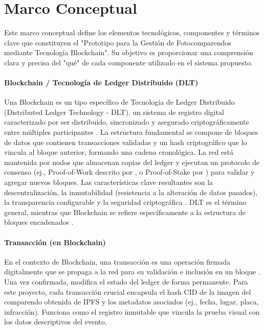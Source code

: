 \section{\large Marco Conceptual}
Este marco conceptual define los elementos tecnológicos, componentes y términos clave que constituyen el "Prototipo para la Gestión de Fotocomparendos mediante Tecnología Blockchain". Su objetivo es proporcionar una comprensión clara y precisa del "qué" de cada componente utilizado en el sistema propuesto. 

\paragraph{Blockchain / Tecnología de Ledger Distribuido (DLT)}
Una Blockchain es un tipo específico de Tecnología de Ledger Distribuido (Distributed Ledger Technology - DLT), un sistema de registro digital caracterizado por ser distribuido, sincronizado y asegurado criptográficamente entre múltiples participantes \parencite{narayanan2016bitcoin}. La estructura fundamental se compone de bloques de datos que contienen transacciones validadas y un hash criptográfico que lo vincula al bloque anterior, formando una cadena cronológica. La red está mantenida por nodos que almacenan copias del ledger y ejecutan un protocolo de consenso (ej., Proof-of-Work descrito por \parencite{nakamoto2008bitcoin}, o Proof-of-Stake por \parencite{king2012ppcoin}) para validar y agregar nuevos bloques. Las características clave resultantes son la descentralización, la inmutabilidad (resistencia a la alteración de datos pasados), la transparencia configurable y la seguridad criptográfica \parencite{swan2015blockchain}. DLT es el término general, mientras que Blockchain se refiere específicamente a la estructura de bloques encadenados \parencite{ukgov2016dlt}.

\paragraph{Transacción (en Blockchain)} 

En el contexto de Blockchain, una transacción es una operación firmada digitalmente que se propaga a la red para su validación e inclusión en un bloque \parencite{antonopoulos2023mastering}. Una vez confirmada, modifica el estado del ledger de forma permanente. Para este proyecto, cada transacción crucial encapsula el hash CID de la imagen del comparendo obtenida de IPFS y los metadatos asociados (ej., fecha, lugar, placa, infracción). Funciona como el registro inmutable que vincula la prueba visual con los datos descriptivos del evento. 

